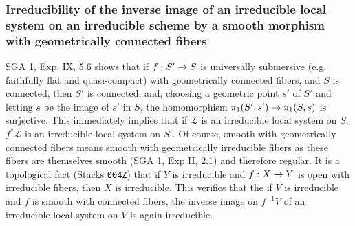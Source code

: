 \documentclass[deligne.tex]{subfiles}
\begin{document}
\subsubsection*{Irreducibility of the inverse image of an irreducible local
system on an irreducible scheme by a smooth morphism with geometrically
connected fibers} SGA 1, Exp. IX, 5.6 shows that if $f:S'\rightarrow S$ is
universally submersive (e.g. faithfully flat and quasi-compact) with
geometrically connected fibers, and $S$ is connected, then $S'$ is
connected, and, choosing a geometric point
$s'$ of $S'$ and letting $s$ be the image of $s'$ in $S$, the homomorphism
$\pi_1(S',s')\rightarrow\pi_1(S,s)$ is surjective. This immediately implies that if
$\mathscr L$ is an irreducible local system on $S$, $f^*\mathscr L$ is an
irreducible local system on $S'$. Of course, smooth with geometrically
connected fibers means smooth with geometrically irreducible fibers as these
fibers are themselves smooth (SGA 1, Exp II, 2.1) and therefore regular.
It is a topological fact
(\href{https://stacks.math.columbia.edu/tag/004Z}{Stacks \texttt{004Z}})
that if $Y$ is irreducible and $f:X\rightarrow Y$ is open with irreducible fibers,
then $X$ is irreducible. This verifies that the if $V$ is irreducible
and $f$ is smooth with connected fibers, the inverse image on $f^{-1}V$
of an irreducible local system on $V$ is again irreducible.
\end{document}
